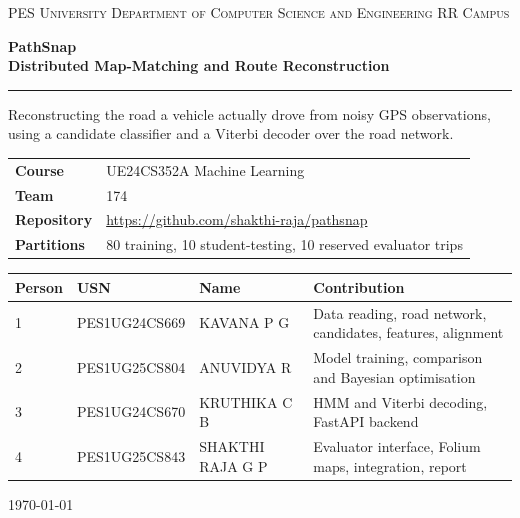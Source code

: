 \documentclass[11pt,a4paper]{article}
\begin{document}
\thispagestyle{empty}
\begin{center}
\vspace*{2.4cm}
{\footnotesize\scshape PES University \quad Department of Computer Science and Engineering \quad RR Campus}

\vspace{1.8cm}
{\Huge\bfseries PathSnap}\\[8pt]
{\LARGE\bfseries Distributed Map-Matching and Route Reconstruction}

\vspace{0.7cm}
{\color{rule}\rule{0.45\textwidth}{0.4pt}}
\vspace{0.7cm}

{\large Reconstructing the road a vehicle actually drove from noisy GPS observations, using a
candidate classifier and a Viterbi decoder over the road network.}

\vspace{2.0cm}
\begin{tabular}{@{}ll@{}}
\textbf{Course} & UE24CS352A Machine Learning \\
\textbf{Team} & 174 \\
\textbf{Repository} & \url{https://github.com/shakthi-raja/pathsnap} \\
\textbf{Partitions} & 80 training, 10 student-testing, 10 reserved evaluator trips \\
\end{tabular}

\vspace{1.1cm}
{\small
\begin{tabular}{@{}p{}p{}p{}p{}@{}}
\textbf{Person} & \textbf{USN} & \textbf{Name} & \textbf{Contribution} \\
\midrule
1 & PES1UG24CS669 & KAVANA P G & Data reading, road network, candidates, features, alignment \\
2 & PES1UG25CS804 & ANUVIDYA R & Model training, comparison and Bayesian optimisation \\
3 & PES1UG24CS670 & KRUTHIKA C B & HMM and Viterbi decoding, FastAPI backend \\
4 & PES1UG25CS843 & SHAKTHI RAJA G P & Evaluator interface, Folium maps, integration, report \\
\end{tabular}
}

\vfill
{\footnotesize\color{muted}\today}
\end{center}
\clearpage
\end{document}
